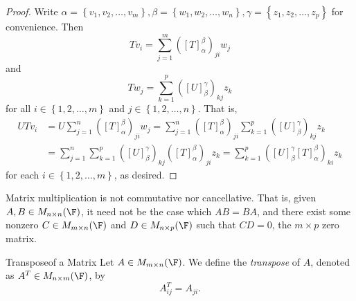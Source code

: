 \documentclass[linearalgebraI]{subfiles}
\begin{document}
    \begin{proof}
        Write $\alpha=\left\lbrace v_1,v_2,\ldots,v_m \right\rbrace, \beta=\left\lbrace w_1,w_2,\ldots,w_n \right\rbrace, \gamma=\left\lbrace z_1,z_2,\ldots,z_p \right\rbrace$ for convenience. Then
        \begin{equation*}
            Tv_i = \sum^{m}_{j=1} \left( \left[ T \right] ^\beta_\alpha \right) _{ji}w_j
        \end{equation*}
        and
        \begin{equation*}
            Tw_j = \sum^{p}_{k=1} \left( \left[ U \right] ^\gamma_\beta \right) _{kj}z_k
        \end{equation*}
        for all $i\in\left\lbrace 1,2,\ldots,m \right\rbrace$ and $j\in\left\lbrace 1,2,\ldots,n \right\rbrace$. That is,
        \begin{align*}
            UTv_i & = U\sum^{n}_{j=1} \left( \left[ T \right] ^\beta_\alpha \right) _{ji}w_j = \sum^{n}_{j=1} \left( \left[ T \right] ^\beta_\alpha \right) _{ji} \sum^{p}_{k=1} \left( \left[ U \right] ^\gamma_\beta \right) _{kj} z_k \\ 
                  & = \sum^{n}_{j=1} \sum^{p}_{k=1} \left( \left[ U \right] ^\gamma_\beta \right) _{kj} \left( \left[ T \right] ^\beta_\alpha \right) _{ji} z_k = \sum^{p}_{k=1} \left( \left[ U \right] ^\gamma_\beta \left[ T \right] ^\beta_\alpha \right) _{ki}z_k
        \end{align*} 
        for each $i\in\left\lbrace 1,2,\ldots,m \right\rbrace$, as desired.
    \end{proof}

    \begin{remark}
        Matrix multiplication is not commutative nor cancellative. That is, given $A,B\in M_{n\times n}(\F)$, it need not be the case which $AB=BA$, and there exist some nonzero $C\in M_{m\times n}(\F)$ and $D\in M_{n\times p}(\F)$ such that $CD=0$, the $m\times p$ zero matrix.   
    \end{remark}

    \begin{definition}{Transpose}{of a Matrix}
        Let $A\in M_{m\times n}(\F)$. We define the \emph{transpose} of $A$, denoted as $A^{T}\in M_{n\times m}(\F)$, by
        \begin{equation*}
            A^{T} _{ij} = A_{ji}.
        \end{equation*}
    \end{definition}
\end{document}
